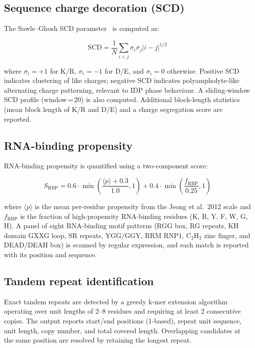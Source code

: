 \documentclass[12pt]{article}
\begin{document}
\subsection{Sequence charge decoration (SCD)}

The Sawle--Ghosh SCD parameter~\citep{sawle2015} is computed as:

\begin{equation}
\mathrm{SCD} = \frac{1}{N} \sum_{i < j} \sigma_i \sigma_j |i - j|^{1/2}
\end{equation}

where $\sigma_i = +1$ for K/R, $\sigma_i = -1$ for D/E, and $\sigma_i = 0$
otherwise.
Positive SCD indicates clustering of like charges; negative SCD indicates
polyampholyte-like alternating charge patterning, relevant to IDP phase
behaviour.
A sliding-window SCD profile (window\,=\,20) is also computed.
Additional block-length statistics (mean block length of K/R and D/E) and a
charge segregation score are reported.

\subsection{RNA-binding propensity}

RNA-binding propensity is quantified using a two-component score:

\begin{equation}
S_{\mathrm{RBP}} = 0.6 \cdot \min\!\left(\frac{\langle p \rangle + 0.3}{1.0}, 1\right)
               + 0.4 \cdot \min\!\left(\frac{f_{\mathrm{RBP}}}{0.25}, 1\right)
\end{equation}

where $\langle p \rangle$ is the mean per-residue propensity from the
Jeong et al.\ 2012 scale and $f_{\mathrm{RBP}}$ is the fraction of
high-propensity RNA-binding residues (K, R, Y, F, W, G, H).
A panel of eight RNA-binding motif patterns (RGG box, RG repeats, KH domain
GXXG loop, SR repeats, YGG/GGY, RRM RNP1, C$_2$H$_2$ zinc finger, and
DEAD/DEAH box) is scanned by regular expression, and each match is reported
with its position and sequence.

\subsection{Tandem repeat identification}

Exact tandem repeats are detected by a greedy k-mer extension algorithm
operating over unit lengths of 2--8 residues and requiring at least 2
consecutive copies.
The output reports start/end positions (1-based), repeat unit sequence, unit
length, copy number, and total covered length.
Overlapping candidates at the same position are resolved by retaining the
longest repeat.
\end{document}
